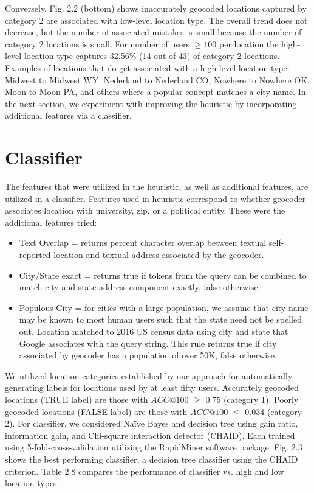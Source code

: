 Conversely, Fig. 2.2 (bottom) shows inaccurately geocoded locations captured by category 2 are associated with low-level location type. The overall trend does not decrease, but the number of associated mistakes is small because the number of category 2 locations is small. For number of users $\geq 100$ per location the high-level location type captures 32.56\% (14 out of 43) of category 2 locations. Examples of locations that do get associated with a high-level location type: Midwest to Midwest WY, Nederland to Nederland CO, Nowhere to Nowhere OK, Moon to Moon PA, and others where a popular concept matches a city name. In the next section, we experiment with improving the heuristic by incorporating additional features via a classifier.

\section{Classifier}

The features that were utilized in the heuristic, as well as additional features, are utilized in a classifier. Features used in heuristic correspond to whether geocoder associates location with university, zip, or a political entity. These were the additional features tried:

\begin{itemize}
\item Text Overlap = returns percent character overlap between textual self-reported location and textual address associated by the geocoder.
\item City/State exact = returns true if tokens from the query can be combined to match city and state address component exactly, false otherwise. 
\item Populous City = for cities with a large population, we assume that city name may be known to most human users such that the state need not be spelled out. Location matched to 2016 US census data using city and state that Google associates with the query string. This rule returns true if city associated by geocoder has a population of over 50K, false otherwise.
\end{itemize}

We utilized location categories established by our approach for automatically generating labels for locations used by at least fifty users. Accurately geocoded locations (TRUE label) are those with $ACC@100$ $\geq$ 0.75 (category 1). Poorly geocoded locations (FALSE label) are those with $ACC@100$ $\leq$ 0.034 (category 2). For classifier, we considered Naïve Bayes and decision tree using gain ratio, information gain, and Chi-square interaction detector (CHAID). Each trained using 5-fold-cross-validation utilizing the RapidMiner software package. Fig. 2.3 shows the best performing classifier, a decision tree classifier using the CHAID criterion. Table 2.8 compares the performance of classifier vs. high and low location types.

